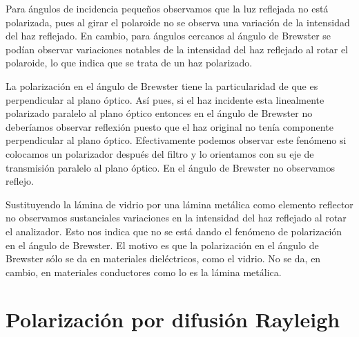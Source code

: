 \documentclass[12pt]{article}
\numberwithin{table}{section}
\numberwithin{figure}{section}
\numberwithin{equation}{section}
\begin{document}
Para ángulos de incidencia pequeños observamos que la luz reflejada no está polarizada, pues al girar el polaroide no se observa una variación de la intensidad del haz reflejado. En cambio, para ángulos cercanos al ángulo de Brewster se podían observar variaciones notables de la intensidad del haz reflejado al rotar el polaroide, lo que indica que se trata de un haz polarizado.  

La polarización en el ángulo de Brewster tiene la particularidad de que es perpendicular al plano óptico. Así pues, si el haz incidente esta linealmente polarizado paralelo al plano óptico entonces en el ángulo de Brewster no deberíamos observar reflexión puesto que el haz original no tenía componente perpendicular al plano óptico. Efectivamente podemos observar este fenómeno si colocamos un polarizador después del filtro y lo orientamos con su eje de transmisión paralelo al plano óptico. En el ángulo de Brewster no observamos reflejo.

Sustituyendo la lámina de vidrio por una lámina metálica como elemento reflector no observamos sustanciales variaciones en la intensidad del haz reflejado al rotar el analizador. Esto nos indica que no se está dando el fenómeno de polarización en el ángulo de Brewster. El motivo es que la polarización en el ángulo de Brewster sólo se da en materiales dieléctricos, como el vidrio. No se da, en cambio, en materiales conductores como lo es la lámina metálica.

\section{Polarización por difusión Rayleigh}
\end{document}
